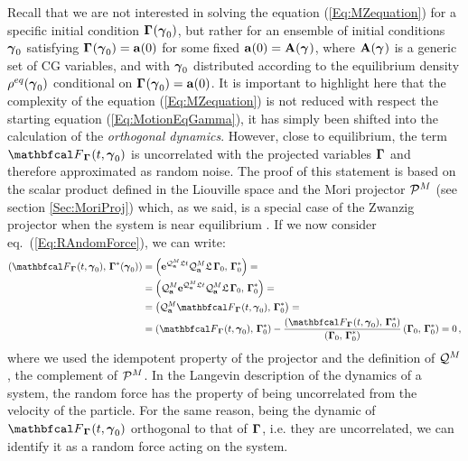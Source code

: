 \documentclass[10pt,a4paper]{book}
\theoremstyle{definition}
\begin{document}
Recall that we are not interested in solving the equation (\ref{Eq:MZequation}) for a specific initial condition $\boldsymbol\Gamma_{}(\boldsymbol\gamma_{0})$, but rather for an ensemble of initial conditions $\boldsymbol\gamma_{0}$ satisfying $\boldsymbol\Gamma_{}(\boldsymbol\gamma_{0})=\mathbf{a}(0)$ for some fixed $\mathbf{a}(0)=\mathbf{A}(\boldsymbol\gamma_{})$, where $\mathbf{A}(\boldsymbol\gamma_{})$ is a generic set of CG variables, and with $\boldsymbol\gamma_{0}$ distributed according to the equilibrium density $\rho^{eq}(\boldsymbol\gamma_{0})$ conditional on $\boldsymbol\Gamma_{}(\boldsymbol\gamma_{0})=\mathbf{a}(0)$. It is important to highlight here that the complexity of the equation (\ref{Eq:MZequation}) is not reduced with respect the starting equation (\ref{Eq:MotionEqGamma}), it has simply been shifted into the calculation of the \emph{orthogonal dynamics}. However, close to equilibrium, the term $\fprojbf_{\Bphase{}}(t,\Aphase{0})$ is uncorrelated with the projected variables $\boldsymbol\Gamma_{}$ and therefore approximated as random noise. 
The proof of this statement is based on the scalar product defined in the Liouville space and the Mori projector $\mathcal{P}^{M}$ (see section \ref{Sec:MoriProj}) which, as we said, is a special case of the Zwanzig projector when the system is near equilibrium \cite{Kauzlaric2011}. If we now consider eq.~(\ref{Eq:RAndomForce}), we can write:
\begin{equation*}
\begin{split}
 \cip{ \fprojbf_{\Bphase{}}(t,\Aphase{0}) ,\, \Bphase{}^*(\Aphase{0}) } &= 
    \cip{ \exp{\qproj_{\bfa}^M\Lio t}\qproj_{\bfa}^M\Lio\,\Bphase{0} ,\, \Bphase{0}^* } = \\
  &= \cip{ \qproj_{\bfa}^M\exp{\qproj_{\bfa}^M\Lio t}\qproj_{\bfa}^M\Lio\,\Bphase{0} ,\, \Bphase{0}^* } = \\
  &= \cip{ \qproj_{\bfa}^M \fprojbf_{\Bphase{}}(t,\Aphase{0}) ,\, \Bphase{0}^* } = \\
  &= \cip{\fprojbf_{\Bphase{}}(t,\Aphase{0}) ,\, \Bphase{0}^* } - 
  \frac{\cip{\fprojbf_{\Bphase{}}(t,\Aphase{0}) ,\, \Bphase{0}^* }}{\cip{\Bphase{0} ,\, \Bphase{0}^* }}\cip{\Bphase{0} ,\, \Bphase{0}^* } =
  0\,,
\end{split}
\end{equation*}
where we used the idempotent property of the projector and the definition of $\mathcal{Q}^M$, the complement of $\mathcal{P}^M$.
In the Langevin description of the dynamics of a system, the random force has the property of being uncorrelated from the velocity of the particle. For the same reason, being the dynamic of $\fprojbf_{\Bphase{}}(t,\Aphase{0})$ orthogonal to that of $\boldsymbol\Gamma_{}$, i.e. they are uncorrelated, we can identify it as a random force acting on the system.
\end{document}
